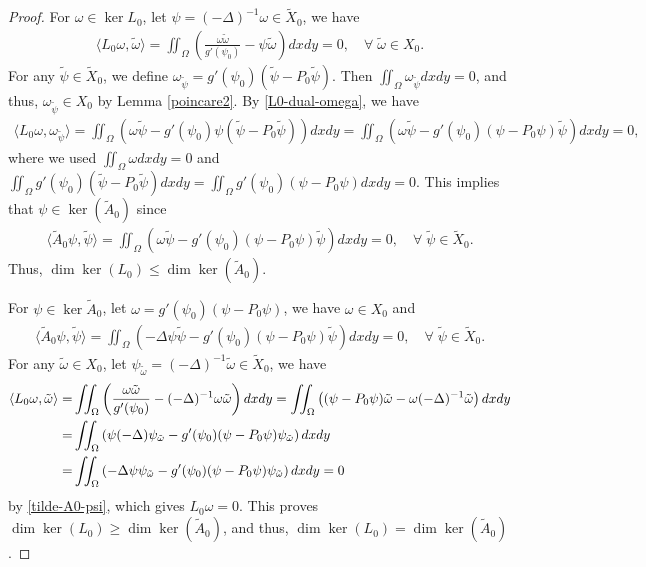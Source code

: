 \documentclass[1 [leqno, 11pt]{amsart}
\numberwithin{equation}{section}
\begin{document}
\begin{CJK*}{GBK}{song}
\begin{proof}
For  $\omega \in \ker L_0$, let $\psi = (-\Delta)^{-1} \omega\in \tilde X_0$, we have
\begin{align}\label{L0-dual-omega}\langle L_0 \omega,\tilde \omega\rangle = \iint_\Omega\left(\frac{\omega\tilde \omega}{g'(\psi_0)} - \psi\tilde \omega\right) dxdy = 0,\quad\forall\; \tilde \omega\in X_0.
\end{align}
For any $\tilde \psi\in \tilde X_0$, we define $\omega_{\tilde \psi}=g'(\psi_0)(\tilde \psi - P_0\tilde\psi)$.
Then $\iint_\Omega\omega_{\tilde \psi}dxdy=0$, and thus, $\omega_{\tilde \psi}\in X_0$ by  Lemma \ref{poincare2}. By \eqref{L0-dual-omega}, we have
\begin{align*}\langle L_0 \omega, \omega_{\tilde \psi}\rangle= \iint_\Omega\left(\omega\tilde \psi - g'(\psi_0)\psi(\tilde\psi - P_0\tilde\psi)\right)dxdy =  \iint_\Omega\left(\omega\tilde \psi - g'(\psi_0)(\psi-P_0\psi)\tilde\psi\right) dxdy = 0,\end{align*}
where we used $\iint_\Omega\omega dxdy=0$ and $\iint_\Omega g'(\psi_0)(\tilde\psi - P_0\tilde\psi)dxdy=\iint_\Omega g'(\psi_0)(\psi-P_0\psi)dxdy=0$. This implies that $\psi\in \ker(\tilde{A}_0)$ since
\begin{align*}\langle\tilde{A}_0 \psi,\tilde \psi\rangle= \iint_\Omega\left(\omega\tilde \psi - g'(\psi_0)(\psi-P_0\psi)\tilde\psi \right)dxdy = 0,\quad\forall \; \tilde \psi\in \tilde X_0.\end{align*}
 Thus,  $\dim\ker(L_0) \leq \dim\ker(\tilde{A}_0)$.

For  $\psi \in \ker \tilde{A}_0$, let $\omega = g'(\psi_0)(\psi - P_0\psi)$, we have $\omega\in X_0$ and
\begin{align}\label{tilde-A0-psi}\langle\tilde{A}_0 \psi,\tilde\psi\rangle =\iint_\Omega \left(-\Delta \psi\tilde\psi - g'(\psi_0)(\psi - P_0\psi)\tilde\psi \right)dxdy =0,\quad\forall \; \tilde \psi\in \tilde X_0.\end{align}
For any $\tilde \omega\in X_0$, let $\psi_{\tilde \omega}=(-\Delta)^{-1}\tilde \omega\in \tilde X_0$, we have
\begin{align*}\langle L_0 \omega, \tilde{\omega}\rangle =& \iint_\Omega\left( {\omega\tilde \omega\over g'(\psi_0)}-(-\Delta)^{-1}\omega\tilde\omega \right)dxdy= \iint_\Omega \left((\psi-P_0\psi)\tilde \omega-\omega(-\Delta)^{-1}\tilde\omega \right) dxdy\\
=& \iint_\Omega \left(\psi(-\Delta)\psi_{\tilde \omega}-g'(\psi_0)(\psi - P_0\psi)\psi_{\tilde \omega} \right)dxdy\\
=&\iint_\Omega  \left( -\Delta\psi\psi_{\tilde \omega}-g'(\psi_0)(\psi - P_0\psi)\psi_{\tilde \omega}\right) dxdy=0
\end{align*}
by \eqref{tilde-A0-psi}, which gives  $L_0 \omega = 0$.  This proves  $\dim\ker(L_0) \geq \dim\ker(\tilde{A}_0)$, and thus, $\dim\ker(L_0) = \dim\ker(\tilde{A}_0)$.



\end{proof}
\end{CJK*}
\end{document}
